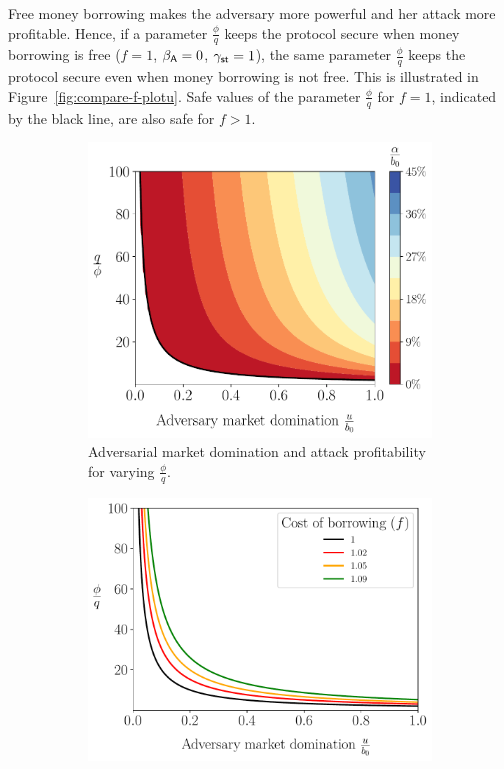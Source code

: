 Free money borrowing makes the adversary more powerful and her attack
more profitable.
Hence, if a parameter $\frac{\phi}{q}$ keeps the protocol secure when money
borrowing is free ($f = 1$, $\beta_{\textsf{A}} = 0$, $\gamma_{\textsf{st}} = 1$),
the same parameter $\frac{\phi}{q}$ keeps the protocol secure even when
money borrowing is not free. This is illustrated in
Figure~\ref{fig:compare-f-plotu}. Safe values of the parameter $\frac{\phi}{q}$
for $f = 1$, indicated by the black line, are also safe for $f > 1$.


\begin{figure}[htb]
  \centering
  \begin{subfigure}{0.49\textwidth}
    \centering
    \includegraphics[width=\textwidth]{./plots/plotu.pdf}
    \caption{Adversarial market domination and attack profitability
             for varying $\frac{\phi}{q}$.}
    \label{fig:contour-plotu}
  \end{subfigure}
  \hfill
  \begin{subfigure}{0.49\textwidth}
    \centering
    \includegraphics[width=\textwidth]{./plots/multiplef_plotu.pdf}

\end{subfigure}
\end{figure}
